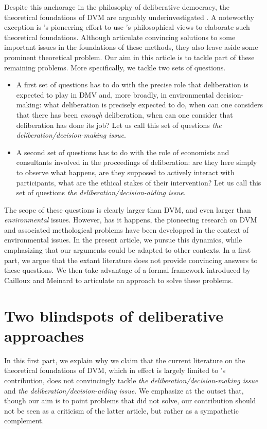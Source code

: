 \documentclass[version=last, pagesize, twoside=off, bibliography=totoc, DIV=calc, fontsize=14pt, a4paper, french, english]{scrartcl}
\begin{document}
Despite this anchorage in the philosophy of deliberative democracy, the theoretical foundations of DVM are arguably underinvestigated \citep{bartkowski_economic_2017,bartkowski_beyond_2018,bunse_what_2015,kenter_what_2015}. A noteworthy exception is \citet{bartkowski_beyond_2018}'s pioneering effort to use \citet{sen_idea_2009}'s philosophical views to elaborate such theoretical foundations. Although \citet{bartkowski_beyond_2018} articulate convincing solutions to some important issues in the foundations of these methods, they also leave aside some prominent theoretical problem. Our aim in this article is to tackle part of these remaining problems. More specifically, we tackle two sets of questions.
\begin{itemize}
\item A first set of questions has to do with the precise role that deliberation is expected to play in DMV and, more broadly, in environmental decision-making: what deliberation is precisely expected to do, when can one considers that there has been \emph{enough} deliberation, when can one consider that deliberation has done its job? Let us call this set of questions \emph{the deliberation/decision-making issue}.
\item A second set of questions has to do with the role of economists and consultants involved in the proceedings of deliberation: are they here simply to observe what happens, are they supposed to actively interact with participants, what are the ethical stakes of their intervention? Let us call this set of questions \emph{the deliberation/decision-aiding issue}.
\end{itemize}
The scope of these questions is clearly larger than DVM, and even larger than \emph{environmental} issues. However, has it happens, the pioneering research on DVM and associated methological problems have been developped in the context of environmental issues. In the present article, we pursue this dynamics, while emphasizing that our arguments could be adapted to other contexts.
In a first part, we argue that the extant  literature does not provide convincing answers to these questions. We then take advantage of a formal framework introduced by Cailloux and Meinard to articulate an approach to solve these problems.

\section{Two blindspots of deliberative approaches}
In this first part, we explain why we claim that the current literature on the theoretical foundations of DVM, which in effect is largely limited to \citet{bartkowski_beyond_2018}'s contribution, does not convincingly tackle \emph{the deliberation/decision-making issue} and \emph{the deliberation/decision-aiding issue}. We emphasize at the outset that, though our aim is to point problems that \citet{bartkowski_beyond_2018} did not solve, our contribution should not be seen as a criticism of the latter article, but rather as a sympathetic complement. 
\end{document}
